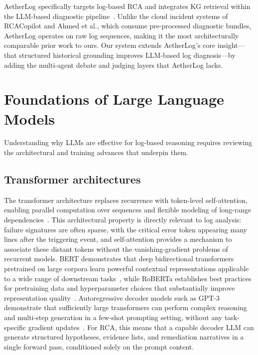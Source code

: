 AetherLog specifically targets log-based RCA and integrates KG retrieval within the
LLM-based diagnostic pipeline~\cite{cui2025aetherlog}. Unlike the cloud incident systems of
RCACopilot and Ahmed et al., which consume pre-processed diagnostic bundles, AetherLog operates
on raw log sequences, making it the most architecturally comparable prior work to ours. Our
system extends AetherLog's core insight---that structured historical grounding improves LLM-based
log diagnosis---by adding the multi-agent debate and judging layers that AetherLog lacks.

\section{Foundations of Large Language Models}

Understanding why LLMs are effective for log-based reasoning requires reviewing the architectural
and training advances that underpin them.

\subsection{Transformer architectures}

The transformer architecture replaces recurrence with token-level self-attention, enabling parallel
computation over sequences and flexible modeling of long-range
dependencies~\cite{vaswani2023attentionneed}. This architectural property is directly relevant
to log analysis: failure signatures are often sparse, with the critical error token appearing many
lines after the triggering event, and self-attention provides a mechanism to associate these
distant tokens without the vanishing-gradient problems of recurrent models. BERT demonstrates that
deep bidirectional transformers pretrained on large corpora learn powerful contextual
representations applicable to a wide range of downstream
tasks~\cite{devlin2019bertpretrainingdeepbidirectional}, while RoBERTa establishes best practices
for pretraining data and hyperparameter choices that substantially improve representation
quality~\cite{liu2019robertarobustlyoptimizedbert}. Autoregressive decoder models such as
GPT-3 demonstrate that sufficiently large transformers can perform complex reasoning and
multi-step generation in a few-shot prompting setting, without any task-specific gradient
updates~\cite{brown2020languagemodelsfewshotlearners}. For RCA, this means that a capable
decoder LLM can generate structured hypotheses, evidence lists, and remediation narratives in
a single forward pass, conditioned solely on the prompt content.

